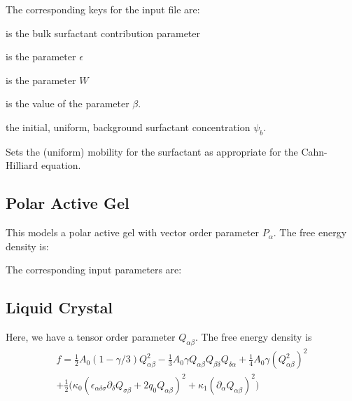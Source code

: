 The corresponding keys for the input file are:

 is the bulk surfactant contribution parameter

 is the parameter $\epsilon$

 is the parameter $W$

 is the value of the parameter $\beta$.

 the initial, uniform, background surfactant
concentration $\psi_b$.

 Sets the (uniform) mobility for the surfactant
as appropriate for the Cahn-Hilliard equation.


\subsection{Polar Active Gel}


This models a polar active gel with vector order parameter $P_\alpha$.
The free energy density is:


The corresponding input parameters are:










\subsection{Liquid Crystal}


Here, we have a tensor order parameter $Q_{\alpha\beta}$.
The free energy density is
\begin{eqnarray}
f = {\textstyle\frac{1}{2}}A_0(1 - \gamma/3)Q^2_{\alpha\beta}
  - {\textstyle\frac{1}{3}}A_0 \gamma
Q_{\alpha\beta}Q_{\beta\delta}Q_{\delta\alpha}
 + {\textstyle\frac{1}{4}}A_0 \gamma (Q^2_{\alpha\beta})^2
\nonumber
\\
+ {\textstyle\frac{1}{2}} \Big(
\kappa_0 (\epsilon_{\alpha\delta\sigma} \partial_\delta Q_{\sigma\beta} +
2q_0 Q_{\alpha\beta})^2 + \kappa_1(\partial_\alpha Q_{\alpha\beta})^2 \Big)
\end{eqnarray}

